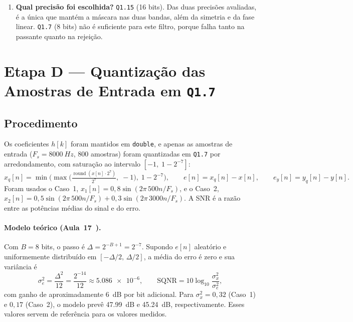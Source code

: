 \documentclass[11pt,a4paper]{article}
\begin{document}
\begin{enumerate}[leftmargin=1.6em, itemsep=3pt]
    \item \textbf{Qual precisão foi escolhida?}
    \texttt{Q1.15} (16 bits). Das duas precisões avaliadas, é a única que mantém a máscara nas duas bandas, além da simetria e da fase linear. \texttt{Q1.7} (8 bits) não é suficiente para este filtro, porque falha tanto na passante quanto na rejeição.
\end{enumerate}

\FloatBarrier
\section{Etapa D — Quantização das Amostras de Entrada em \texttt{Q1.7}}

\subsection{Procedimento}

Os coeficientes $h[k]$ foram mantidos em \texttt{double}, e apenas as amostras de entrada ($F_s = \SI{8000}{Hz}$, 800 amostras) foram quantizadas em \texttt{Q1.7} por arredondamento, com saturação ao intervalo $[-1,\; 1 - 2^{-7}]$:
\begin{equation}
    x_q[n] = \min\!\Big(\max\!\Big(\tfrac{\operatorname{round}(x[n]\cdot 2^7)}{2^7},\; -1\Big),\; 1 - 2^{-7}\Big), \qquad e[n] = x_q[n] - x[n], \qquad e_y[n] = y_q[n] - y[n].
\end{equation}
Foram usados o Caso~1, $x_1[n] = 0,8\sin(2\pi\,500n/F_s)$, e o Caso~2, $x_2[n] = 0,5\sin(2\pi\,500n/F_s) + 0,3\sin(2\pi\,3000n/F_s)$. A SNR é a razão entre as potências médias do sinal e do erro.

\paragraph{Modelo teórico (Aula~17~\cite{aula17}).} Com $B = 8$ bits, o passo é $\Delta = 2^{-B+1} = 2^{-7}$. Supondo $e[n]$ aleatório e uniformemente distribuído em $[-\Delta/2,\, \Delta/2]$, a média do erro é zero e sua variância é
\begin{equation}
    \sigma_e^2 = \frac{\Delta^2}{12} = \frac{2^{-14}}{12} \approx \num{5,086e-6}, \qquad \text{SQNR} = 10\log_{10}\frac{\sigma_x^2}{\sigma_e^2},
\end{equation}
com ganho de aproximadamente \SI{6}{dB} por bit adicional. Para $\sigma_x^2 = 0,32$ (Caso~1) e $0,17$ (Caso~2), o modelo prevê \SI{47,99}{dB} e \SI{45,24}{dB}, respectivamente. Esses valores servem de referência para os valores medidos.
\end{document}
